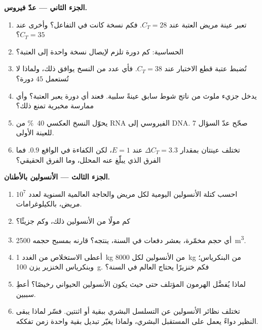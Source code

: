 \begin{problem}
\medskip
\noindent\textbf{الجزء الثاني --- عدّ فيروس.}
\begin{enumerate}[resume]
  \item تعبر عينة مريض العتبة عند $C_{T} = 28$. فكم
        نسخة كانت في التفاعل؟ وأخرى عند $C_{T} = 35$؟
  \item الحساسية: كم دورة تلزم لإيصال نسخة واحدة
        إلى العتبة؟
  \item تُضبط عتبة قطع الاختبار عند $C_{T} = 38$. فأي عدد من
        النسخ يوافق ذلك، ولماذا لا تُستعمل $45$ دورة؟
  \item يدخل جزيء ملوث من ناتج شوط سابق عينةً
        سلبية. فعند أي دورة يعبر العتبة؟
        وأي ممارسة مخبرية تمنع ذلك؟
  \item يحوّل النسخ العكسي \qty{40}{\%} من RNA الفيروسي إلى
        DNA. صحّح عدّ السؤال 7 للعينة الأولى.
  \item تختلف عينتان بمقدار $\Delta C_{T} = 3.3$ عند $E = 1$، لكن
        الكفاءة في الواقع $0.9$. فما الفرق الذي يبلّغ عنه
        المحلل، وما الفرق الحقيقي؟
\end{enumerate}

\medskip
\noindent\textbf{الجزء الثالث --- الأنسولين بالأطنان.}
\begin{enumerate}[resume]
  \item احسب كتلة الأنسولين اليومية لكل مريض والحاجة
        العالمية السنوية لعدد $10^{7}$ مريض، بالكيلوغرامات.
  \item كم مولًا من الأنسولين ذلك، وكم جزيئًا؟
  \item أي حجم مخمّرة، بعشر دفعات في السنة، ينتجه؟
        قارنه بمسبح حجمه \qty{2500}{m^3}.
  \item أعطى الاستخلاص من الغدد \qty{1}{kg} من الأنسولين لكل
        \qty{8000}{kg} من البنكرياس؛ وبنكرياس الخنزير يزن
        \qty{100}{g}. فكم خنزيرًا يحتاج العالم في السنة؟
  \item لماذا يُفضَّل الهرمون المؤتلف حتى حيث يكون الأنسولين
        الحيواني رخيصًا؟ أعطِ سببين.
  \item تختلف نظائر الأنسولين عن التسلسل البشري ببقية أو
        اثنتين. فسّر لماذا يبقى النظير دواءً يعمل على
        المستقبل البشري، ولماذا يغيّر تبديل بقية واحدة
        زمن تفككه.
\end{enumerate}


\end{problem}
